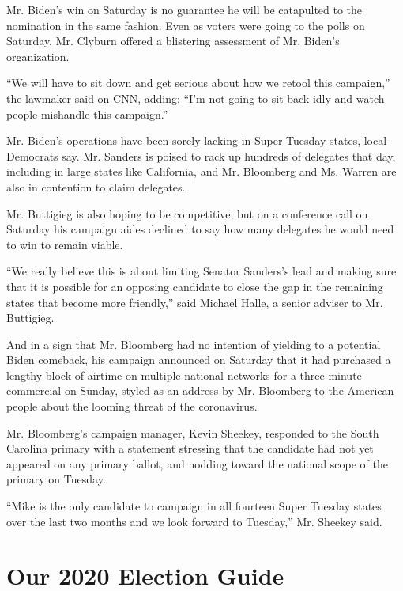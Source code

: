 Mr. Biden's win on Saturday is no guarantee he will be catapulted to the
nomination in the same fashion. Even as voters were going to the polls
on Saturday, Mr. Clyburn offered a blistering assessment of Mr. Biden's
organization.

``We will have to sit down and get serious about how we retool this
campaign,'' the lawmaker said on CNN, adding: ``I'm not going to sit
back idly and watch people mishandle this campaign.''

Mr. Biden's operations
\href{https://www.nytimes3xbfgragh.onion/2020/02/26/us/politics/joe-biden-california-super-tuesday.html?searchResultPosition=1}{have
been sorely lacking in Super Tuesday states}, local Democrats say. Mr.
Sanders is poised to rack up hundreds of delegates that day, including
in large states like California, and Mr. Bloomberg and Ms. Warren are
also in contention to claim delegates.

Mr. Buttigieg is also hoping to be competitive, but on a conference call
on Saturday his campaign aides declined to say how many delegates he
would need to win to remain viable.

``We really believe this is about limiting Senator Sanders's lead and
making sure that it is possible for an opposing candidate to close the
gap in the remaining states that become more friendly,'' said Michael
Halle, a senior adviser to Mr. Buttigieg.

And in a sign that Mr. Bloomberg had no intention of yielding to a
potential Biden comeback, his campaign announced on Saturday that it had
purchased a lengthy block of airtime on multiple national networks for a
three-minute commercial on Sunday, styled as an address by Mr. Bloomberg
to the American people about the looming threat of the coronavirus.

Mr. Bloomberg's campaign manager, Kevin Sheekey, responded to the South
Carolina primary with a statement stressing that the candidate had not
yet appeared on any primary ballot, and nodding toward the national
scope of the primary on Tuesday.

``Mike is the only candidate to campaign in all fourteen Super Tuesday
states over the last two months and we look forward to Tuesday,'' Mr.
Sheekey said.

\hypertarget{our-2020-election-guide}{%
\section{Our 2020 Election Guide}\label{our-2020-election-guide}}

